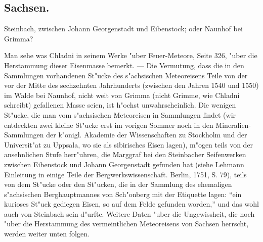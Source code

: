 \documentclass[a4paper, 11pt, oneside, polutonikogreek, german]{article}
\begin{document}
\setlength{\leftskip}{0pt}
\setlength{\parindent}{20pt}

\subsection{Sachsen.}
\begin{center}
\small
Steinbach, zwischen Johann Georgenstadt und Eibenstock; oder Naunhof bei Grimma?
\end{center}

\setlength{\leftskip}{10mm}
\setlength{\parindent}{0pt}

{\footnotesize Man sehe was Chladni in seinem Werke "uber Feuer-Meteore, Seite 326, "uber die Herstammung dieser Eisenmasse bemerkt. --- Die Vermutung, dass die in den Sammlungen vorhandenen St"ucke des s"achsischen Meteoreisens Teile von der vor der Mitte des sechzehnten Jahrhunderts (zwischen den Jahren 1540 und 1550) im Walde bei Naunhof, nicht weit von Grimma (nicht Grimme, wie Chladni schreibt) gefallenen Masse seien, ist h"ochst unwahrscheinlich. Die wenigen St"ucke, die man vom s"achsischen Meteoreisen in Sammlungen findet (wir entdeckten zwei kleine St"ucke erst im vorigen Sommer noch in den Mineralien-Sammlungen der k"onigl. Akademie der Wissenschaften zu Stockholm und der Universit"at zu Uppsala, wo sie als sibirisches Eisen lagen), m"ogen teils von der ansehnlichen Stufe herr"uhren, die Marggraf bei den Steinbacher Seifenwerken zwischen Eibenstock und Johann Georgenstadt gefunden hat (siehe Lehmann Einleitung in einige Teile der Bergwerkswissenschaft. Berlin, 1751, S. 79), teils von dem St"ucke oder den St"ucken, die in der Sammlung des ehemaligen s"achsischen Berghauptmannes von Sch"onberg mit der Etiquette lagen: "`ein kurioses St"uck gediegen Eisen, so auf dem Felde gefunden worden,"' und das wohl auch von Steinbach sein d"urfte. Weitere Daten "uber die Ungewissheit, die noch "uber die Herstammung des vermeintlichen Meteoreisens von Sachsen herrscht, werden weiter unten folgen.}

\setlength{\leftskip}{0pt}
\setlength{\parindent}{20pt}
\end{document}
